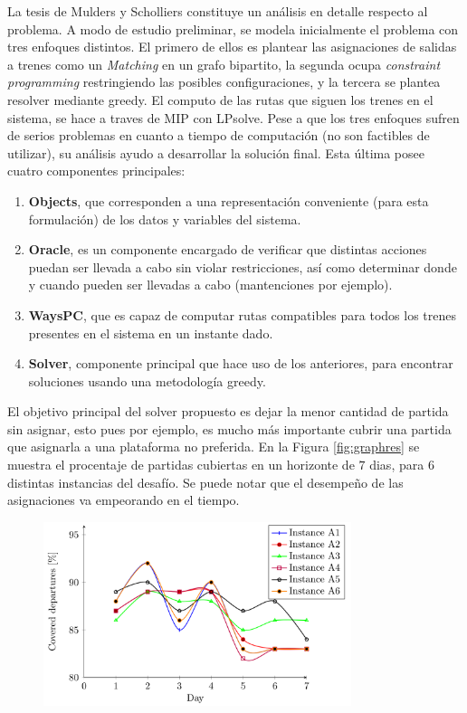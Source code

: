 \documentclass[letter, 10pt]{article}
\begin{document}
\begin{description}
	La tesis de Mulders y Scholliers \cite{Mulders} constituye un análisis en detalle respecto al problema. A modo de estudio preliminar, se modela inicialmente el problema con tres enfoques distintos. El primero de ellos es plantear las asignaciones de salidas a trenes como un \textit{Matching} en un grafo bipartito, la segunda ocupa \textit{constraint programming} restringiendo las posibles configuraciones, y la tercera se plantea resolver mediante greedy. El computo de las rutas que siguen los trenes en el sistema, se hace a traves de MIP con LPsolve. Pese a que los tres enfoques sufren de serios problemas en cuanto a tiempo de computación (no son factibles de utilizar), su análisis ayudo a desarrollar la solución final. Esta última posee cuatro componentes principales:
	\begin{enumerate}
		\item \textbf{Objects}, que corresponden a una representación conveniente (para esta formulación) de los datos y variables del sistema.
		\item \textbf{Oracle}, es un componente encargado de verificar que distintas acciones puedan ser llevada a cabo sin violar restricciones, así como determinar donde y cuando pueden ser llevadas a cabo (mantenciones por ejemplo).
		\item \textbf{WaysPC}, que es capaz de computar rutas compatibles para todos los trenes presentes en el sistema en un instante dado.
		\item \textbf{Solver}, componente principal que hace uso de los anteriores, para encontrar soluciones usando una metodología greedy. 
	\end{enumerate}
	El objetivo principal del solver propuesto es dejar la menor cantidad de partida sin asignar, esto pues por ejemplo, es mucho más importante cubrir una partida que asignarla a una plataforma no preferida. En la Figura \ref{fig:graphres} se
	muestra el procentaje de partidas cubiertas en un horizonte de $7$ dias, para $6$ distintas instancias del desafío. Se puede notar que el desempeño de las asignaciones va empeorando en el tiempo.
	\begin{figure}[htpb!]
	\centering
	\includegraphics[width=9cm]{graphres}

\end{figure}
\end{description}
\end{document}
